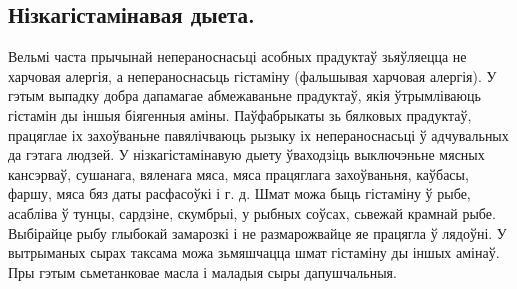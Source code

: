\subsection{Нізкагістамінавая дыета.}
Вельмі часта прычынай непераноснасьці асобных прадуктаў зьяўляецца не харчовая алергія, а непераноснасьць гістаміну (фальшывая харчовая алергія). У гэтым выпадку добра дапамагае абмежаваньне прадуктаў, якія ўтрымліваюць гістамін ды іншыя біягенныя аміны. Паўфабрыкаты зь бялковых прадуктаў, працяглае іх захоўваньне павялічваюць рызыку іх непераноснасьці ў адчувальных да гэтага людзей. У нізкагістамінавую дыету ўваходзіць выключэньне мясных кансэрваў, сушанага, вяленага мяса, мяса працяглага захоўваньня, каўбасы, фаршу, мяса бяз даты расфасоўкі і г. д. Шмат можа быць гістаміну ў рыбе, асабліва ў тунцы, сардзіне, скумбрыі, у рыбных соўсах, сьвежай крамнай рыбе. Выбірайце рыбу глыбокай замарозкі і не размарожвайце яе працягла ў лядоўні. У вытрыманых сырах таксама можа зьмяшчацца шмат гістаміну ды іншых амінаў. Пры гэтым сьметанковае масла і маладыя сыры дапушчальныя.
